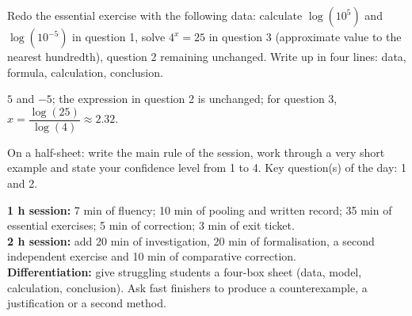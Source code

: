 
\begin{homework}Redo the essential exercise with the following data: calculate $\log(10^{5})$ and $\log(10^{-5})$ in question 1, solve $4^x=25$ in question 3 (approximate value to the nearest hundredth), question 2 remaining unchanged. Write up in four lines: data, formula, calculation, conclusion.\end{homework}
\begin{solution}$5$ and $-5$; the expression in question 2 is unchanged; for question 3, $x=\dfrac{\log(25)}{\log(4)}\approx\num{2,32}$.\end{solution}

\begin{exitticket}[3 minutes]On a half-sheet: write the main rule of the session, work through a very short example and state your confidence level from 1 to 4. Key question(s) of the day: 1 and 2.\end{exitticket}

\ifmxteacher
\begin{method}
\textbf{1 h session:} 7 min of fluency; 10 min of pooling and written record; 35 min of essential exercises; 5 min of correction; 3 min of exit ticket.\\
\textbf{2 h session:} add 20 min of investigation, 20 min of formalisation, a second independent exercise and 10 min of comparative correction.\\
\textbf{Differentiation:} give struggling students a four-box sheet (data, model, calculation, conclusion). Ask fast finishers to produce a counterexample, a justification or a second method.
\end{method}
\fi
